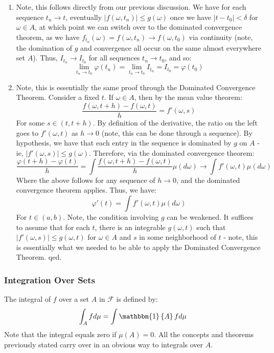 \documentclass[12pt,a4paper]{article}
\newcommand{\1}[1]{\mathbbm{1}\left\{ #1 \right\}}
\newcommand{\fcal}{\mathcal{F}}
\begin{document}
\begin{enumerate}
	\item Note, this follows directly from our previous discussion. We have for each sequence $t_n \to t$, eventually $|f(\omega, t_n)| \leq g(\omega)$ once we have $|t - t_0| < \delta$ for $\omega \in A$, at which point we can switch over to the dominated convergence theorem, as we have $f_{t_n}(\omega) = f(\omega, t_n) \to f(\omega, t_0)$ via continuity (note, the domination of $g$ and convergence all occur on the same almost everywhere set $A$). Thus, $I_{t_n} \to I_{t_0}$ for all sequences $t_n \to t_0$, and so:
	$$
		\lim_{t_n \to t_0} \varphi(t_n) = \lim_{t_n \to t_0} I_{t_n} = I_{t_0} = \varphi(t_0)
	$$
	
	\item Note, this is essentially the same proof through the Dominated Convergence Theorem. Consider a fixed $t$. If $\omega \in A$, then by the mean value theorem:
	$$
		\frac{f(\omega, t + h) - f(\omega, t)}{h} = f'(\omega, s)
	$$
	For some $s \in (t, t+h)$. By definition of the derivative, the ratio on the left goes to $f'(\omega, t)$ as $h \to 0$ (note, this can be done through a sequence). By hypothesis, we have that each entry in the sequence is dominated by $g$ on $A$ - ie, $|f'(\omega, s)| \leq g(\omega)$. Therefore, via the dominated convergence theorem:
	$$
		\frac{\varphi(t + h) - \varphi(t)}{h} =
		\int \frac{f(\omega, t + h) - f(\omega, t)}{h} \mu(d\omega) \to
		\int f'(\omega, t) \mu(d\omega)
	$$
	Where the above follows for any sequence of $h \to 0$, and the dominated convergence theorem applies. Thus, we have:
	$$
		\varphi'(t) = \int f'(\omega, t) \mu(d\omega)
	$$
	For $t \in (a,b)$. Note, the condition involving $g$ can be weakened. It suffices to assume that for each $t$, there is an integrable $g(\omega, t)$ such that $|f'(\omega, s)| \leq g(\omega, t)$ for $\omega \in A$ and $s$ in some neighborhood of $t$ - note, this is essentially what we needed to be able to apply the Dominated Convergence Theorem. qed.
\end{enumerate}

\subsubsection{Integration Over Sets}
The integral of $f$ over a set $A$ in $\fcal$ is defined by:
$$
	\int_A f d\mu = \int \1{A} f d\mu
$$
Note that the integral equals zero if $\mu(A) = 0$. All the concepts and theorems previously stated carry over in an obvious way to integrals over $A$.
\end{document}
